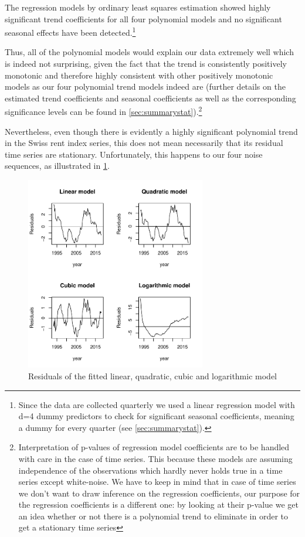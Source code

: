 \documentclass[11pt,a4paper]{article}
\begin{document}
The regression models by ordinary least squares estimation \cite[p.~11]{htf09} showed highly significant trend coefficients for all four polynomial models and no significant seasonal effects have been detected.\footnote{
    Since the data are collected quarterly we used a linear regression model with d=4 dummy predictors to check for significant seasonal coefficients, meaning a dummy for every quarter (see \cref{sec:summarystat}).}


Thus, all of the polynomial models would explain our data extremely well which is indeed not surprising, given the fact that the trend is consistently positively monotonic and therefore highly consistent with other positively monotonic models as our four polynomial trend models indeed are (further details on the estimated trend coefficients and seasonal coefficients as well as the corresponding significance levels can be found in \cref{sec:summarystat}).\footnote{
    Interpretation of p-values of regression model coefficients are to be handled with care in the case of time series. This because these models are assuming independence of the observations which hardly never holds true in a time series except white-noise.
    We have to keep in mind that in case of time series we don't want to draw inference on the regression coefficients, our purpose for the regression coefficients is a different one: by looking at their p-value we get an idea whether or not there is a polynomial trend to eliminate in order to get a stationary time series
}


Nevertheless, even though there is evidently a highly significant polynomial trend in the Swiss rent index series, this does not mean necessarily that its residual time series are stationary.
Unfortunately, this happens to our four noise sequences, as illustrated in \cref{fig:resid_polynomials}.
\begin{figure} [ht!]
    \centering
    \includegraphics[width=0.7\textwidth]{resid_polynomials}
    \caption{Residuals of the fitted linear, quadratic, cubic and logarithmic model}
    \label{fig:resid_polynomials}
\end{figure}
\end{document}
